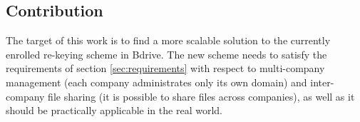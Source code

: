 \subsection{Contribution}
The target of this work is to find a more scalable solution to the currently enrolled re-keying scheme in Bdrive. The new scheme needs to satisfy the requirements of section \ref{sec:requirements} with respect to multi-company management (each company administrates only its own domain) and inter-company file sharing (it is possible to share files across companies), as well as it should be practically applicable in the real world.
